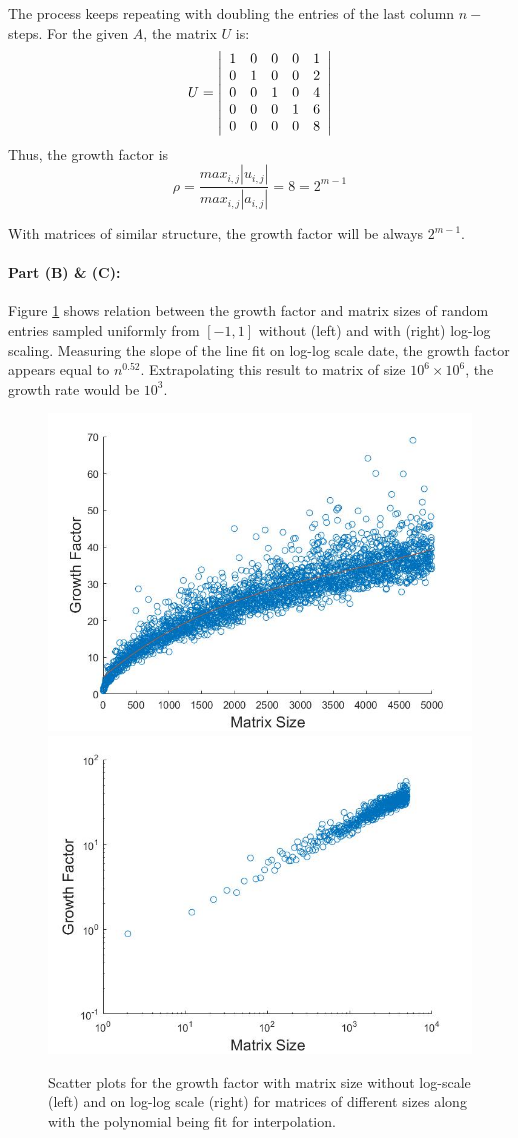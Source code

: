 The process keeps repeating with doubling the entries of the last column $n-$steps. For the given $A$, the matrix $U$ is:
\[
U =
\left| 
\begin{array}{cc cc c}
1 &  0 &  0 &  0 & 1  \\
0 &  1 &  0 &  0 & 2  \\
0 &  0 &  1 &  0 & 4  \\
0 &  0 &  0 &  1 & 6  \\
0 &  0 &  0 &  0 & 8  \\
\end{array} 
\right|
\] 
Thus, the growth factor is 
\[
\rho = \frac{max_{i,j}|u_{i,j}|}{max_{i,j}|a_{i,j}|} = 8 = 2^{m-1}
\]

With matrices of similar structure, the growth factor will be always  $2^{m-1}$. 

\paragraph{Part (B) \& (C):}
Figure \ref{fig:3b} shows relation between the growth factor and matrix sizes of random entries sampled uniformly from $[-1,1]$ without (left) and with (right) log-log scaling. Measuring the slope of the line fit on log-log scale date, the growth factor appears equal to $n^{0.52}$. Extrapolating this result to matrix of size $10^{6} \times 10^{6}$, the growth rate would be $10^{3}$.
 
\begin{figure}[tbh]
 \centering  
   {\includegraphics[width=0.48\linewidth]{code/prob3_nolog.jpg}}   
   {\includegraphics[width=0.48\linewidth]{code/prob3_log.jpg}}
  \caption{Scatter plots for the growth factor with matrix size without log-scale (left) and on log-log scale (right) for matrices of different sizes along with the polynomial being fit for interpolation.}
   \label{fig:3b}
\end{figure} 
